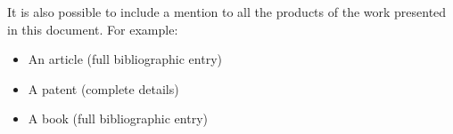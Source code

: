 \pagestyle{MyThesisStyle}

\vspace*{\fill}
\noindent It is also possible to include a mention to all the products of the work presented in this document. For example:
\begin{itemize}
    \item An article (full bibliographic entry)
    \item A patent (complete details)
    \item A book (full bibliographic entry)
\end{itemize}
\vspace{\fill}
